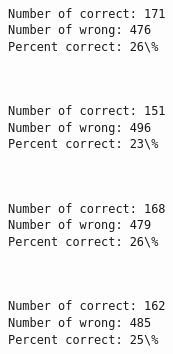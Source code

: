 \documentclass[11pt]{article}
\begin{document}
    \begin{center}
    \end{center}
    { \hspace*{\fill} \\}
    
    \begin{Verbatim}[commandchars=\\\{\}]
Number of correct: 171
Number of wrong: 476
Percent correct: 26\%

    \end{Verbatim}

    \begin{center}
    \end{center}
    { \hspace*{\fill} \\}
    
    \begin{Verbatim}[commandchars=\\\{\}]
Number of correct: 151
Number of wrong: 496
Percent correct: 23\%

    \end{Verbatim}

    \begin{center}
    \end{center}
    { \hspace*{\fill} \\}
    
    \begin{Verbatim}[commandchars=\\\{\}]
Number of correct: 168
Number of wrong: 479
Percent correct: 26\%

    \end{Verbatim}

    \begin{center}
    \end{center}
    { \hspace*{\fill} \\}
    
    \begin{Verbatim}[commandchars=\\\{\}]
Number of correct: 162
Number of wrong: 485
Percent correct: 25\%

    \end{Verbatim}
\end{document}
